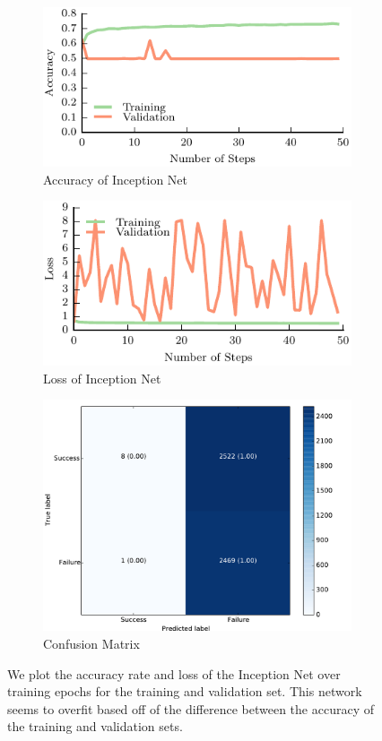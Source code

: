 \begin{figure}[t!]
    \centering
    \begin{subfigure}[t]{0.49\textwidth}
        \includegraphics[width=0.9\columnwidth]{figs/inception_accuracy.pdf}
        \caption{Accuracy of Inception Net} \label{fig:accuracy}
        \end{subfigure}
    \begin{subfigure}[t]{0.49\textwidth}
        \includegraphics[width=0.9\columnwidth]{figs/inception_loss.pdf}
        \caption{Loss of Inception Net} \label{fig:loss_inception}
    \end{subfigure}
		\begin{subfigure}[t]{0.32\textwidth}
        \includegraphics[width=0.8\columnwidth]{figs/confusion_inception.pdf}
        \caption{Confusion Matrix} \label{fig:confusion_res}
    \end{subfigure}
\caption{We plot the accuracy rate and loss of the Inception Net over training epochs for the training and validation set. This network seems to overfit based off of the difference between the accuracy of the training and validation sets. } \label{fig:inceptionnet_results}
\end{figure}


